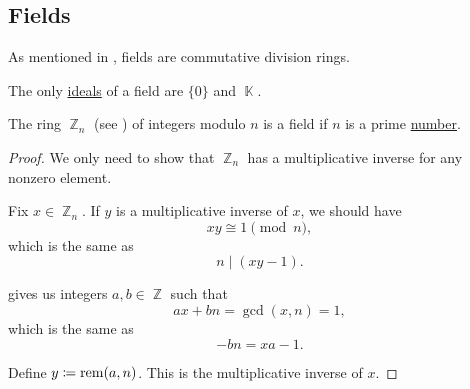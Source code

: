 \subsection{Fields}\label{subsec:fields}

\begin{definition}\label{def:field}
  As mentioned in , fields are commutative division rings.
\end{definition}

\begin{proposition}\label{thm:ideals_of_field}
  The only \hyperref[def:semiring_ideal]{ideals} of a field are \( \{ 0 \} \) and \( \BbbK \).
\end{proposition}

\begin{theorem}\label{thm:ring_of_integers_module_prime_is_field}
  The ring \( \BbbZ_n \) (see ) of integers modulo \( n \) is a field if \( n \) is a prime \hyperref[def:prime_number]{number}.
\end{theorem}
\begin{proof}
  We only need to show that \( \BbbZ_n \) has a multiplicative inverse for any nonzero element.

  Fix \( x \in \BbbZ_n \). If \( y \) is a multiplicative inverse of \( x \), we should have
  \begin{equation*}
    xy \cong 1 \pmod n,
  \end{equation*}
  which is the same as
  \begin{equation*}
    n \mid (xy - 1).
  \end{equation*}

   gives us integers \( a, b \in \BbbZ \) such that
  \begin{equation*}
    ax + bn = \gcd(x, n) = 1,
  \end{equation*}
  which is the same as
  \begin{equation*}
    -bn = xa - 1.
  \end{equation*}

  Define \( y \coloneqq \operatorname{rem}(a, n) \). This is the multiplicative inverse of \( x \).
\end{proof}

